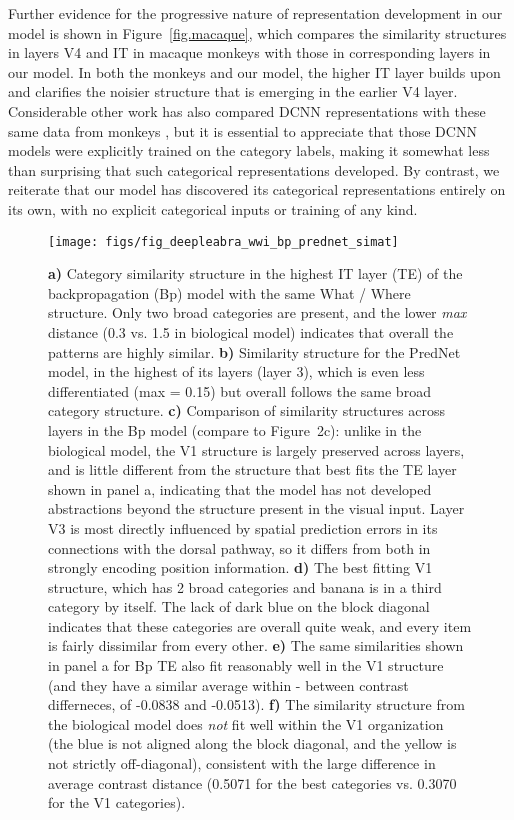 \documentclass[12pt,twoside]{nature}
\newif\myifpdf
\begin{document}
Further evidence for the progressive nature of representation development in our model is shown in Figure~\ref{fig.macaque}, which compares the similarity structures in layers V4 and IT in macaque monkeys \cite{CadieuHongYaminsEtAl14} with those in corresponding layers in our model.  In both the monkeys and our model, the higher IT layer builds upon and clarifies the noisier structure that is emerging in the earlier V4 layer.  Considerable other work has also compared DCNN representations with these same data from monkeys \cite{CadieuHongYaminsEtAl14}, but it is essential to appreciate that those DCNN models were explicitly trained on the category labels, making it somewhat less than surprising that such categorical representations developed.  By contrast, we reiterate that our model has discovered its categorical representations entirely on its own, with no explicit categorical inputs or training of any kind.

\begin{figure}
  \centering\texttt{[image: figs/fig\_deepleabra\_wwi\_bp\_prednet\_simat]}
  \caption{\small {\bf a)} Category similarity structure in the highest IT layer (TE) of the backpropagation (Bp) model with the same What / Where structure.  Only two broad categories are present, and the lower {\em max} distance (0.3 vs. 1.5 in biological model) indicates that overall the patterns are highly similar.  {\bf b)} Similarity structure for the PredNet model, in the highest of its layers (layer 3), which is even less differentiated (max = 0.15) but overall follows the same broad category structure.  {\bf c)} Comparison of similarity structures across layers in the Bp model (compare to Figure~2c): unlike in the biological model, the V1 structure is largely preserved across layers, and is little different from the structure that best fits the TE layer shown in panel a, indicating that the model has not developed abstractions beyond the structure present in the visual input.  Layer V3 is most directly influenced by spatial prediction errors in its connections with the dorsal pathway, so it differs from both in strongly encoding position information.  {\bf d)} The best fitting V1 structure, which has 2 broad categories and banana is in a third category by itself.  The lack of dark blue on the block diagonal indicates that these categories are overall quite weak, and every item is fairly dissimilar from every other.  {\bf e)} The same similarities shown in panel a for Bp TE also fit reasonably well in the V1 structure (and they have a similar average within - between contrast differneces, of -0.0838 and -0.0513).  {\bf f)} The similarity structure from the biological model does {\em not} fit well within the V1 organization (the blue is not aligned along the block diagonal, and the yellow is not strictly off-diagonal), consistent with the large difference in average contrast distance (0.5071 for the best categories vs. 0.3070 for the V1 categories).}
  \label{fig.bpred}
\end{figure}
\end{document}
